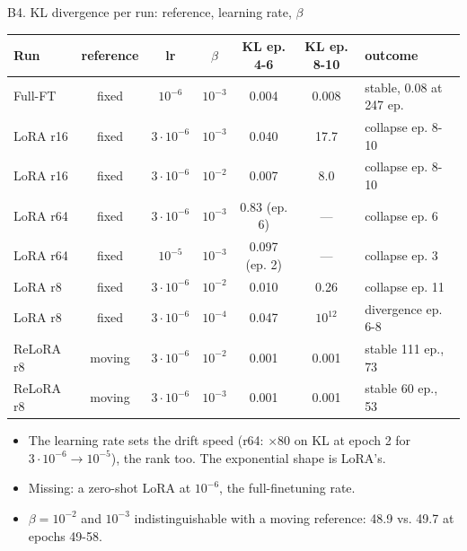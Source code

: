\documentclass[aspectratio=169,10pt]{beamer}
\begin{document}
\begin{frame}{B4. KL divergence per run: reference, learning rate, $\beta$}
\scriptsize
\begin{tabular}{@{}lcccccl@{}}
\toprule
Run & reference & lr & $\beta$ & KL ep. 4-6 & KL ep. 8-10 & outcome \\
\midrule
Full-FT & fixed & $10^{-6}$ & $10^{-3}$ & 0.004 & 0.008 & stable, 0.08 at 247 ep. \\
LoRA r16 & fixed & $3\cdot10^{-6}$ & $10^{-3}$ & 0.040 & 17.7 & collapse ep. 8-10 \\
LoRA r16 & fixed & $3\cdot10^{-6}$ & $10^{-2}$ & 0.007 & 8.0 & collapse ep. 8-10 \\
LoRA r64 & fixed & $3\cdot10^{-6}$ & $10^{-3}$ & 0.83 (ep. 6) & — & collapse ep. 6 \\
LoRA r64 & fixed & $10^{-5}$ & $10^{-3}$ & 0.097 (ep. 2) & — & collapse ep. 3 \\
LoRA r8 & fixed & $3\cdot10^{-6}$ & $10^{-2}$ & 0.010 & 0.26 & collapse ep. 11 \\
LoRA r8 & fixed & $3\cdot10^{-6}$ & $10^{-4}$ & 0.047 & $10^{12}$ & divergence ep. 6-8 \\
ReLoRA r8 & moving & $3\cdot10^{-6}$ & $10^{-2}$ & 0.001 & 0.001 & stable 111 ep., 73 \\
ReLoRA r8 & moving & $3\cdot10^{-6}$ & $10^{-3}$ & 0.001 & 0.001 & stable 60 ep., 53 \\
\bottomrule
\end{tabular}
\vspace{0.3cm}
\small
\begin{itemize}
  \item The learning rate sets the drift speed (r64: $\times 80$ on KL at epoch 2 for $3\cdot10^{-6}\to10^{-5}$), the rank too. The exponential shape is LoRA's.
  \item Missing: a zero-shot LoRA at $10^{-6}$, the full-finetuning rate.
  \item $\beta=10^{-2}$ and $10^{-3}$ indistinguishable with a moving reference: 48.9 vs. 49.7 at epochs 49-58.
\end{itemize}
\end{frame}
\end{document}
